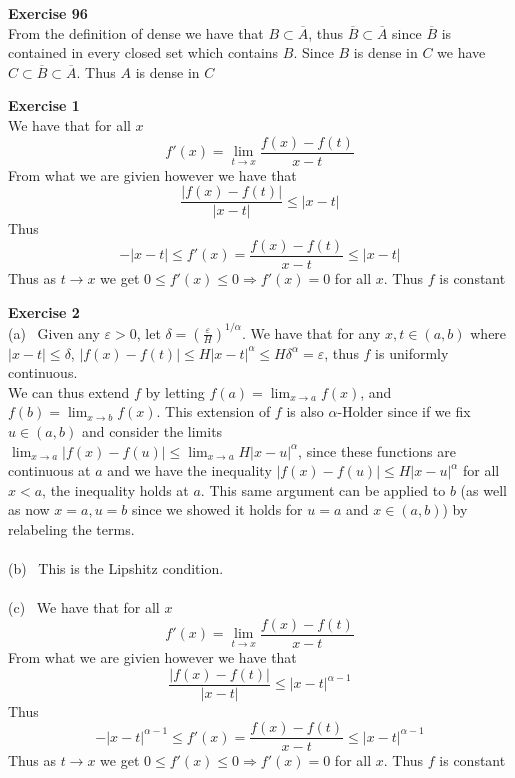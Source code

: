 \documentclass[12pt]{article}
\newenvironment{ques}[1]{\textbf{Exercise #1}\vspace{1 mm}\\ }{\bigskip}
\theoremstyle{definition}
\renewcommand{\l}{\left }
\renewcommand{\r}{\right }
\renewcommand{\a}{\alpha}
\begin{document}
\begin{ques}{96}
	From the definition of dense we have that $B \subset \overline A$, thus
	$\overline B \subset \overline A$ since $\overline B$ is contained in every
	closed set which contains $B$. Since $B$ is dense in $C$ we have $C \subset
	\overline B \subset \overline A$. Thus $A$ is dense in $C$
\end{ques}

\begin{ques}{1}
	We have that for all $x$
	$$f'(x) = \lim_{t \to x} \frac{f(x) - f(t)}{x-t}$$
	From what we are givien however we have that 
	$$\frac{|f(x) - f(t)|}{|x-t|} \leq |x-t|$$
	Thus
	$$-|x-t| \leq f'(x) = \frac{f(x) - f(t)}{x-t} \leq |x-t|$$
	Thus as $t \to x$ we get $0 \leq f'(x) \le 0 \Rightarrow f'(x) = 0$ for all
	$x$. Thus $f$ is constant
\end{ques}

\begin{ques}{2}
	(a) \ Given any $\varepsilon > 0$, let $\delta =
	\l(\frac{\varepsilon}{H}\r)^{1/\a}$. We have that for any $x,t \in (a,b)$
	where $|x - t| \le \delta$, $|f(x) - f(t)| \le H|x - t|^\a \le H\delta^\a
	= \varepsilon$, thus $f$ is uniformly continuous.\\
	We can thus extend $f$ by letting $f(a) = \lim_{x \to a} f(x)$, and $f(b) =
	\lim_{x \to b} f(x)$. This extension of $f$ is also $\a$-Holder since if we
	fix $u \in (a,b)$ and consider the limits  $\lim_{x\to a} |f(x) - f(u)|
	\leq \lim_{x \to a} H|x - u|^\a$, since these functions are continuous at $a$
	and we have the inequality $|f(x) - f(u)| \le H|x-u|^\a$ for all $x < a$,
	the inequality holds at $a$. This same argument can be applied to $b$
	(as well as now $x= a, u = b$ since we showed it holds for $u = a$ and $x \in
	(a,b)$) by relabeling the terms.\\
	\\
	(b) \ This is the Lipshitz condition.\\
	\\
	(c) \ We have that for all $x$
	$$f'(x) = \lim_{t \to x} \frac{f(x) - f(t)}{x-t}$$
	From what we are givien however we have that 
	$$\frac{|f(x) - f(t)|}{|x-t|} \leq |x-t|^{\a - 1}$$
	Thus
	$$-|x-t|^{\a - 1} \leq f'(x) = \frac{f(x) - f(t)}{x-t} \leq |x-t|^{\a - 1}$$
	Thus as $t \to x$ we get $0 \leq f'(x) \le 0 \Rightarrow f'(x) = 0$ for all
	$x$. Thus $f$ is constant
\end{ques}
\end{document}
